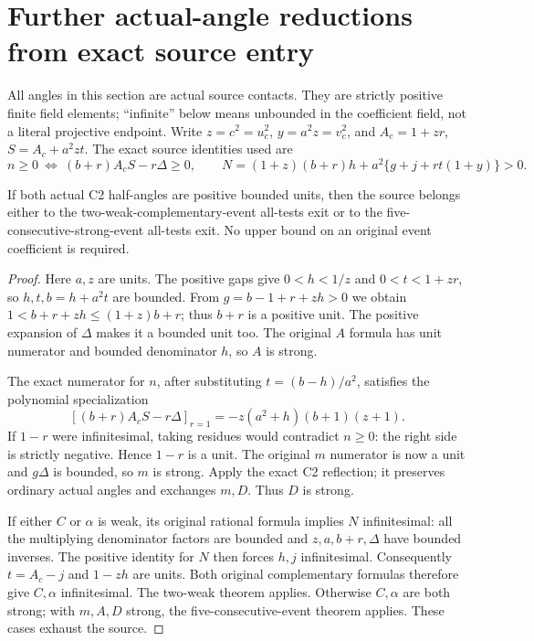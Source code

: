 \section[Further actual-angle reductions from exact source entry]{Further actual-angle reductions from exact source entry}
\label{sec:c2-angle-reductions}

All angles in this section are actual source contacts. They are strictly
positive finite field elements; ``infinite'' below means unbounded in
the coefficient field, not a literal projective endpoint. Write
$z=c^2=u_c^2$, $y=a^2z=v_c^2$, and
$A_c=1+zr$, $S=A_c+a^2zt$. The exact source identities used are
\[
 n\ge0\ \Longleftrightarrow\ (b+r)A_cS-r\Delta\ge0,
 \qquad
 N=(1+z)(b+r)h+a^2\{g+j+rt(1+y)\}>0.
\]

\begin{theorem}
If both actual C2 half-angles are positive bounded units, then the
source belongs either to the two-weak-complementary-event all-tests
exit or to the five-consecutive-strong-event all-tests exit. No upper
bound on an original event coefficient is required.
\end{theorem}
\begin{proof}
Here $a,z$ are units. The positive gaps give $0<h<1/z$ and
$0<t<1+zr$, so $h,t,b=h+a^2t$ are bounded. From
$g=b-1+r+zh>0$ we obtain $1<b+r+zh\le(1+z)b+r$;
thus $b+r$ is a positive unit. The positive expansion of $\Delta$
makes it a bounded unit too. The original $A$ formula has unit
numerator and bounded denominator $h$, so $A$ is strong.

The exact numerator for $n$, after substituting $t=(b-h)/a^2$,
satisfies the polynomial specialization
\[
 \left[(b+r)A_cS-r\Delta\right]_{r=1}
     =-z(a^2+h)(b+1)(z+1).
\]
If $1-r$ were infinitesimal, taking residues would contradict
$n\ge0$: the right side is strictly negative. Hence $1-r$ is a
unit. The original $m$ numerator is now a unit and $g\Delta$ is
bounded, so $m$ is strong. Apply the exact C2 reflection; it preserves
ordinary actual angles and exchanges $m,D$. Thus $D$ is strong.

If either $C$ or $\alpha$ is weak, its original rational formula
implies $N$ infinitesimal: all the multiplying denominator factors
are bounded and $z,a,b+r,\Delta$ have bounded inverses. The positive
identity for $N$ then forces $h,j$ infinitesimal. Consequently
$t=A_c-j$ and $1-zh$ are units. Both original complementary formulas
therefore give $C,\alpha$ infinitesimal. The two-weak theorem applies.
Otherwise $C,\alpha$ are both strong; with $m,A,D$ strong, the
five-consecutive-event theorem applies. These cases exhaust the source.
\end{proof}

